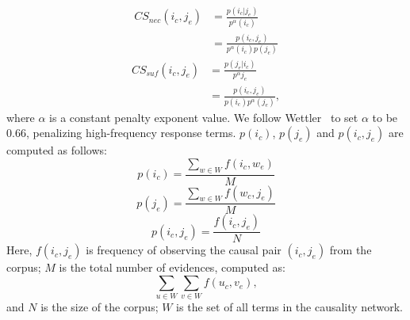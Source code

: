 \begin{align}
CS_{nec}(i_c,j_e)  & =  \frac{p(i_c|j_e)}{p^{\alpha}(i_c)} \nonumber \\
                   & = \frac{p(i_c,j_e)}{p^{\alpha}(i_c)p(j_e)}
\label{eq:csnec}
\end{align}
\begin{align}
CS_{suf}(i_c,j_e) & = \frac{p(j_e|i_c)}{p^{\alpha}{j_e}} \nonumber \\
                  & = \frac{p(i_c,j_e)}{p(i_c)p^{\alpha}(j_e)}
,\label{eq:cssuf}
\end{align}
where $\alpha$ is a constant penalty exponent value.
We follow Wettler~ to set $\alpha$ to be $0.66$,
penalizing high-frequency response terms.
$p(i_c)$, $p(j_e)$ and $p(i_c,j_e)$ are computed as follows:
\begin{equation}
p(i_c) = \frac{\sum_{w\in W}
f (i_c,w_e)}{M}
\end{equation}
\begin{equation}
p(j_e) = \frac{\sum_{w\in W}
f (w_c,j_e)}{M}
\end{equation}
\begin{equation}
p(i_c,j_e) = \frac{f(i_c,j_e)}{N}
\end{equation}
Here, $f(i_c,j_e)$ is frequency of observing the causal pair
$(i_c,j_e)$
from the corpus; $M$ is the total number of evidences, computed as:
$$\sum_{u\in W} \sum_{v\in W} f(u_c,v_e),$$
and $N$ is the size of the corpus;
$W$ is the set of all terms in the causality network.

